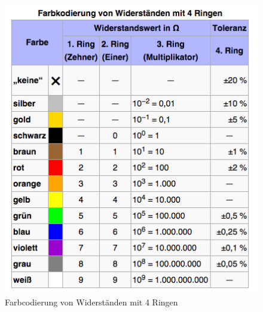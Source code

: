 \begin{frame}
  \begin{center}
    \begin{figure}
      \includegraphics[width=\textwidth,height=.9\textheight,keepaspectratio]{e04/4-Ringe.png}
      \caption{Farbcodierung von Widerständen mit 4 Ringen \cite{ringe4}}
      \label{fig_ringe4}
    \end{figure}
  \end{center}
\end{frame}


